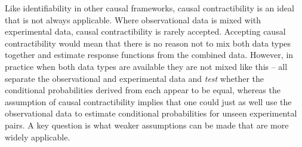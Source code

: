 Like identifiability in other causal frameworks, causal contractibility is an ideal that is not always applicable. Where observational data is mixed with experimental data, causal contractibility is rarely accepted. Accepting causal contractibility would mean that there is no reason not to mix both data types together and estimate response functions from the combined data. However, in practice when both data types are available they are not mixed like this -- \citet{eckles_bias_2021,gordon_comparison_2018,gordon_close_2022} all separate the observational and experimental data and \emph{test} whether the conditional probabilities derived from each appear to be equal, whereas the assumption of causal contractibility implies that one could just as well use the observational data to estimate conditional probabilities for unseen experimental pairs. A key question is what weaker assumptions can be made that are more widely applicable.



